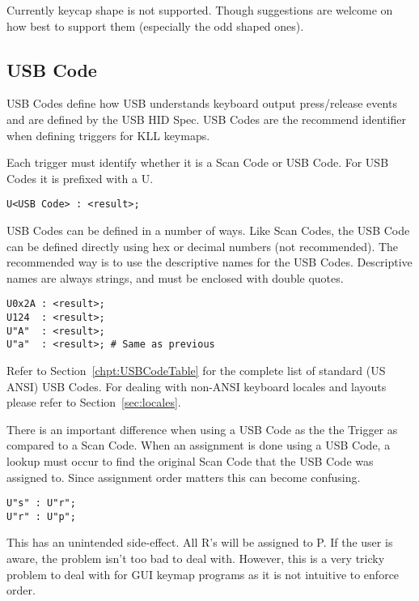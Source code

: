 \documentclass{kiibohd-template}
\begin{document}
Currently keycap shape is not supported.
Though suggestions are welcome on how best to support them (especially the odd shaped ones).


\subsection{USB Code}
\label{subsec:USB_Code}

USB Codes define how USB understands keyboard output press/release events and are defined by the USB HID Spec.
USB Codes are the recommend identifier when defining triggers for KLL keymaps.

Each trigger must identify whether it is a Scan Code or USB Code.
For USB Codes it is prefixed with a U.

\begin{lstlisting}
U<USB Code> : <result>;
\end{lstlisting}

USB Codes can be defined in a number of ways.
Like Scan Codes, the USB Code can be defined directly using hex or decimal numbers (not recommended).
The recommended way is to use the descriptive names for the USB Codes.
Descriptive names are always strings, and must be enclosed with double quotes.

\begin{lstlisting}
U0x2A : <result>;
U124  : <result>;
U"A"  : <result>;
U"a"  : <result>; # Same as previous
\end{lstlisting}

Refer to Section~\ref{chpt:USBCodeTable} for the complete list of standard (US ANSI) USB Codes.
For dealing with non-ANSI keyboard locales and layouts please refer to Section~\ref{sec:locales}.

There is an important difference when using a USB Code as the the Trigger as compared to a Scan Code.
When an assignment is done using a USB Code, a lookup must occur to find the original Scan Code that the USB Code was assigned to.
Since assignment order matters this can become confusing.

\begin{lstlisting}
U"s" : U"r";
U"r" : U"p";
\end{lstlisting}

This has an unintended side-effect.
All R's will be assigned to P.
If the user is aware, the problem isn't too bad to deal with.
However, this is a very tricky problem to deal with for GUI keymap programs as it is not intuitive to enforce order.
\end{document}
